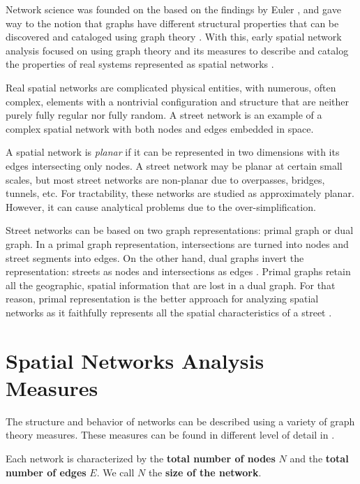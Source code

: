 Network science was founded on the based on the findings by Euler \cite{euler_1741}, and gave way to the notion that graphs have different structural properties that can be discovered and cataloged using graph theory \cite{barabasi_2016}. With this, early spatial network analysis focused on using graph theory and its measures to describe and catalog the properties of real systems represented as spatial networks \cite{anderson_2020}. 

Real spatial networks are complicated physical entities, with numerous, often complex, elements with a nontrivial configuration and structure that are neither purely fully regular nor fully random. A street network is an example of a complex spatial network with both nodes and edges embedded in space.

A spatial network is \textit{planar} if it can be represented in two dimensions with its edges intersecting only nodes. A street network may be planar at certain small scales, but most street networks are non-planar due to overpasses, bridges, tunnels, etc. For tractability, these networks are studied as approximately planar. However, it can cause analytical problems due to the over-simplification.

Street networks can be based on two graph representations: primal graph or dual graph. In a primal graph representation, intersections are turned into nodes and street segments into edges. On the other hand, dual graphs invert the representation: streets as nodes and intersections as edges \cite{porta_streets_2006}. Primal graphs retain all the geographic, spatial information that are lost in a dual graph. For that reason, primal representation is the better approach for analyzing spatial networks as it faithfully represents all the spatial characteristics of a street \cite{ratti_spacesyntax_2004}.

\section{Spatial Networks Analysis Measures}

The structure and behavior of networks can be described using a variety of graph theory measures. These measures can be found in different level of detail in \cite{barabasi_2016, barthelemy_spatial_2011, lewis_2011, newman_2004, newman_2010, menczer_fortunato_davis_2020}.

Each network is characterized by the \textbf{total number of nodes} $N$ and the \textbf{total number of edges} $E$. We call $N$ the \textbf{size of the network}. 

